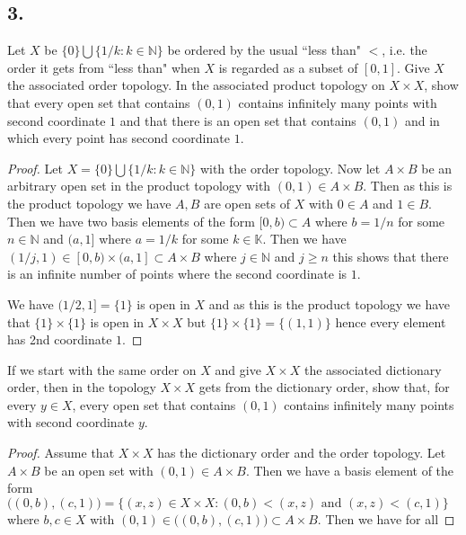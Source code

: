 \documentclass{amsart}
\theoremstyle{plain}
\theoremstyle{definition}
\theoremstyle{remark}
\begin{document}
\vspace{.15in}

\noindent
\subsection*{3.} Let $X$ be $\{0\} \bigcup \{ 1/k : k\in \mathbb N \}$ be ordered by the usual ``less than" $<$, i.e. the order it gets from ``less than" when $X$ is regarded as a subset of $[0,1]$. Give $X$ the associated order topology. In the associated product topology on $X\times X$, show that every open set that contains $(0,1)$ contains infinitely many points with second coordinate $1$ and that there is an open set that contains $(0,1)$ and in which every point has second coordinate $1$. 

\begin{proof}
    Let $X= \{0\}\bigcup \{1/k:k\in \mathbb{N}\}$ with the order topology. Now let $A\times B$ be an arbitrary open set in the product topology with $(0,1)\in A\times B$. Then as this is the product topology we have $A,B$ are open sets of $X$ with $0\in A$ and $1\in B$. Then we have two basis elements of the form $[0,b)\subset A$ where $b=1/n$ for some $n\in \mathbb{N}$ and $(a,1]$ where $a=1/k$ for some $k\in \mathbb{K}$. Then we have $(1/j,1)\in [0,b)\times (a,1]\subset A\times B$ where $j\in \mathbb{N}$ and $j\geq n$ this shows that there is an infinite number of points where the second coordinate is $1$. 
    
    We have $(1/2,1]=\{1\}$ is open in $X$ and as this is the product topology we have that $\{1\}\times \{1\}$ is open in $X\times X$ but $\{1\}\times \{1\}=\{(1,1)\}$ hence every element has 2nd coordinate $1$.
\end{proof}

If we start with the same order on $X$ and give $X\times X$ the associated dictionary order, then in the topology $X\times X$ gets from the dictionary order, show that, for every $y\in X$, every open set that contains $(0,1)$ contains infinitely many points with second coordinate $y$.

\begin{proof}
    Assume that $X\times X$ has the dictionary order and the order topology. Let $A\times B$ be an open set with $(0,1)\in A\times B$. Then we have a basis element of the form $\big((0,b),(c,1)\big)=\{(x,z)\in X\times X: (0,b)< (x,z)\text{ and }(x,z)<(c,1)\}$ where $b,c\in X$ with $(0,1)\in \big((0,b),(c,1)\big)\subset A\times B$. Then we have for all 



\end{proof}
\end{document}
